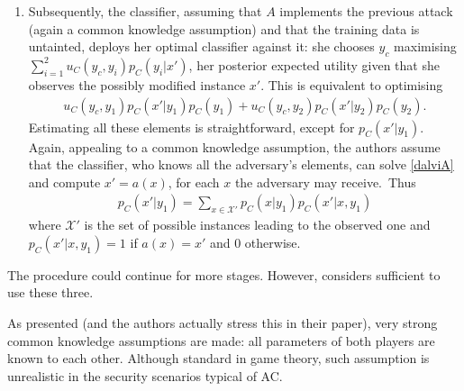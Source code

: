 \begin{enumerate}
\item Subsequently, the classifier, assuming that $A$ implements the previous attack (again a common knowledge assumption) and that the training data is untainted, deploys her optimal classifier against it:
she chooses $y_c$ maximising $\sum_{i=1}^2 u_C(y_c, y_i) p_C(y_i |x')$, her posterior expected utility given that she observes the possibly modified instance $x'$. This is equivalent to optimising 
%
\begin{eqnarray}\label{dalviCK}
u_C (y_c, y_1) p_C(x' |y_1) p_C(y_1) + u_C (y_c, y_2) p_C(x' |y_2) p_C(y_2).
\end{eqnarray}
%
Estimating all these elements is straightforward, except for $p_C(x' \vert y_1)$. Again, appealing to a common knowledge assumption, the authors assume that the classifier, who knows all the adversary's elements, can solve 
\eqref{dalviA} and compute $x' = a(x)$, for each $x$ the adversary may receive.~Thus
%
\begin{eqnarray*} 
p_C(x' |y_1) = \sum_{x \in \mathcal{X}'} p_C (x \vert y_1) p_C (x' \vert x, y_1)
\end{eqnarray*}
where $\mathcal{X}'$ is the set of possible instances leading to the observed one and $p_C(x' \vert x, y_1) = 1$ if $a(x) = x'$ and 0 otherwise.
%
%
\end{enumerate}
%
The procedure could continue for more stages.
However, \textcite{dalvi2004adversarial} considers sufficient to use these three.


As presented (and the authors actually stress this
in their paper), very strong common knowledge assumptions are made: all parameters of both players are known to each other. Although standard in game theory, such  assumption is unrealistic in the security scenarios  
typical of AC.



